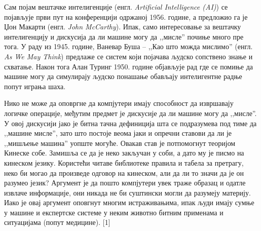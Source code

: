 Сам појам вештачке интелигенције (енгл. \textit{Artificial Intelligence (AI)}) се појављује први пут на конференцији одржаној 1956. године, а предложио га је Џон Макарти (енгл. \textit{John McCarthy}). Ипак, само интересовање за вештачку интелигенцију и дискусија да ли машине могу да ,,мисле'' почиње много пре тога. У раду из 1945. године, Ваневар Буша – ,,Као што можда мислимо'' (енгл. \textit{As We May Think}) предлаже се систем који појачава људско сопствено знање и схватање. Након тога Алан Туринг 1950. године објављује рад где се помиње да машине могу да симулирају људско понашање обављају интелигентне радње попут играња шаха.

Нико не може да оповргне да компјутери имају способност да извршавају логичке операције, међутим предмет је дискусије да ли машине могу да ,,мисле''. У овој дискусији јако је битна тачна дефиниција шта се подразумева под тиме да ,,машине мисле'', зато што постоје веома јаки и опречни ставови да ли је ,,мишљење машина'' уопште могуће. Овакав став је потпомогнут теоријом Кинеске собе. Замишља се да је неко закључан у соби, а дато му је писмо на кинеском језику. Користећи читаве библиотеке правила и табела за претрагу, неко би могао да произведе одговор на кинеском, али да ли то значи да је он разумео језик? Аргумент је да пошто компјутери увек траже образац и одатле извлаче информације, они никада не би суштински могли да разумеју материју.
Иако је овај аргумент оповгнут многим истраживањима, ипак људи имају сумње у машине и експертске системе у неким животно битним применама и ситуацијама (попут медицине). [1]
